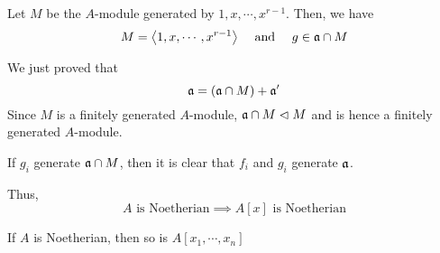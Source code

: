 Let \(M\) be the \(A\)-module generated by \(1, x, \cdots, x^{r-1}\).
Then, we have
\[
	M = \ang*{1, x, \cdots, x^{r-1}} \qandq
	g \in \mfa \cap M
\]

We just proved that
\[
	\mathfrak{a} = \left( \mathfrak{a} \cap M \right) + \mathfrak{a}'
\]
Since \(M\) is a finitely generated \(A\)-module,
\(\mathfrak{a} \cap M \vartriangleleft M\) and is hence a finitely generated \(A\)-module.

If \(g_i\) generate \(\mathfrak{a} \cap M\), then it is clear that
\(f_i\) and \(g_i\) generate \(\mathfrak{a}\).

Thus,
\[
	A \text{ is Noetherian}
	\implies A[x] \text{ is Noetherian}
\]

\begin{corollary}{}{}
	If \(A\) is Noetherian, then so is \(A[x_1, \cdots, x_n]\)
\end{corollary}
